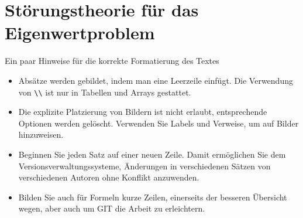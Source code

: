 %
%
%
\chapter{Störungstheorie für das Eigenwertproblem\label{chapter:ew}}
\begin{refsection}

Ein paar Hinweise für die korrekte Formatierung des Textes
\begin{itemize}
\item
Absätze werden gebildet, indem man eine Leerzeile einfügt.
Die Verwendung von \verb+\\+ ist nur in Tabellen und Arrays gestattet.
\item
Die explizite Platzierung von Bildern ist nicht erlaubt, entsprechende
Optionen werden gelöscht. 
Verwenden Sie Labels und Verweise, um auf Bilder hinzuweisen.
\item
Beginnen Sie jeden Satz auf einer neuen Zeile. 
Damit ermöglichen Sie dem Versionsverwaltungssysteme, Änderungen
in verschiedenen Sätzen von verschiedenen Autoren ohne Konflikt 
anzuwenden.
\item 
Bilden Sie auch für Formeln kurze Zeilen, einerseits der besseren
Übersicht wegen, aber auch um GIT die Arbeit zu erleichtern.
\end{itemize}






\printbibliography[heading=subbibliography]
\end{refsection}
